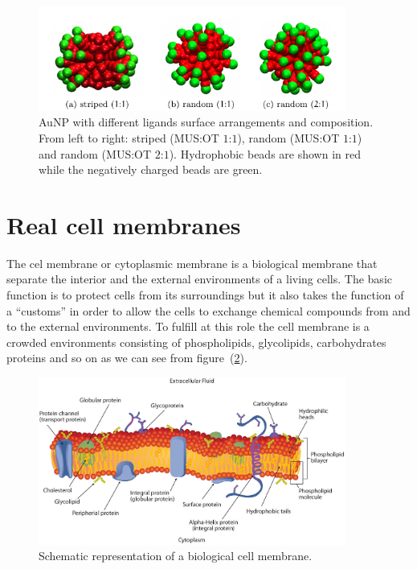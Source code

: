 \begin{figure}[!ht]
	\centering
	\includegraphics[width=0.9\textwidth]{./img/coatings/coat}
	\caption{Au\acs{NP} with different ligands surface arrangements and composition. From left to right: striped (\ac{MUS}:\ac{OT} $1$:$1$), random (\ac{MUS}:\ac{OT} $1$:$1$) and random (\ac{MUS}:\ac{OT} $2$:$1$). Hydrophobic beads are shown in red while the negatively charged beads are green.}
	\label{fig:coating}
\end{figure}


\section{Real cell membranes}
The cel membrane or cytoplasmic membrane is a biological membrane that separate the interior and the external environments of a living cells. The basic function is to protect cells from its surroundings but it also takes the function of a ``customs'' in order to allow the cells to exchange chemical compounds from and to the external environments. To fulfill at this role the cell membrane is a crowded environments consisting of phospholipids, glycolipids, carbohydrates proteins and so on as we can see from figure~(\ref{fig:cellMembrane}).
\begin{figure}[!ht]
	\centering
	\includegraphics[width=0.9\textwidth]{./img/cellMembrane}
	\caption{Schematic representation of a biological cell membrane.}
	\label{fig:cellMembrane}
\end{figure}

